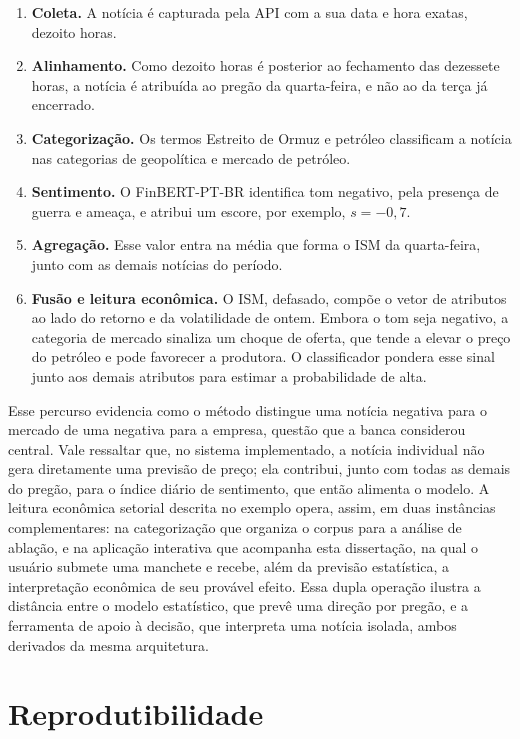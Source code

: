 \begin{enumerate}
    \item \textbf{Coleta.} A notícia é capturada pela API com a sua data e hora exatas, dezoito horas.
    \item \textbf{Alinhamento.} Como dezoito horas é posterior ao fechamento das dezessete horas, a notícia é atribuída ao pregão da quarta-feira, e não ao da terça já encerrado.
    \item \textbf{Categorização.} Os termos Estreito de Ormuz e petróleo classificam a notícia nas categorias de geopolítica e mercado de petróleo.
    \item \textbf{Sentimento.} O FinBERT-PT-BR identifica tom negativo, pela presença de guerra e ameaça, e atribui um escore, por exemplo, $s = -0{,}7$.
    \item \textbf{Agregação.} Esse valor entra na média que forma o ISM da quarta-feira, junto com as demais notícias do período.
    \item \textbf{Fusão e leitura econômica.} O ISM, defasado, compõe o vetor de atributos ao lado do retorno e da volatilidade de ontem. Embora o tom seja negativo, a categoria de mercado sinaliza um choque de oferta, que tende a elevar o preço do petróleo e pode favorecer a produtora. O classificador pondera esse sinal junto aos demais atributos para estimar a probabilidade de alta.
\end{enumerate}

Esse percurso evidencia como o método distingue uma notícia negativa para o mercado de uma negativa para a empresa, questão que a banca considerou central. Vale ressaltar que, no sistema implementado, a notícia individual não gera diretamente uma previsão de preço; ela contribui, junto com todas as demais do pregão, para o índice diário de sentimento, que então alimenta o modelo. A leitura econômica setorial descrita no exemplo opera, assim, em duas instâncias complementares: na categorização que organiza o corpus para a análise de ablação, e na aplicação interativa que acompanha esta dissertação, na qual o usuário submete uma manchete e recebe, além da previsão estatística, a interpretação econômica de seu provável efeito. Essa dupla operação ilustra a distância entre o modelo estatístico, que prevê uma direção por pregão, e a ferramenta de apoio à decisão, que interpreta uma notícia isolada, ambos derivados da mesma arquitetura.

\section{Reprodutibilidade}

